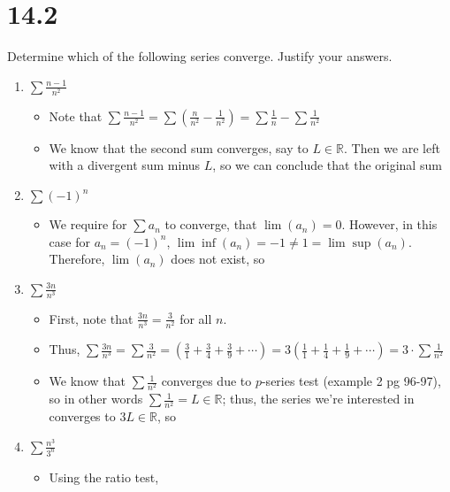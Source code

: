 \documentclass[10pt,a4paper]{article}
\theoremstyle{definition}
\begin{document}
\section*{14.2}
Determine which of the following series converge. Justify your answers.
\begin{enumerate}[label = (\alph*)]
\item $\displaystyle \sum \frac{n - 1}{n^2}$
	\begin{itemize}
	\item Note that $\displaystyle \sum \frac{n - 1}{n^2} = \sum \left(\frac{n}{n^2}- \frac{1}{n^2}\right) = \sum \frac{1}{n} - \sum \frac{1}{n^2}$
	\item We know that the second sum converges, say to $L \in \mathbb{R}$. Then we are left with a divergent sum minus $L$, so we can conclude that the original sum 
	\end{itemize}
\item $\displaystyle \sum (-1)^n$
	\begin{itemize}
	\item We require for $\sum a_n$ to converge, that $\lim (a_n) = 0$. However, in this case for $a_n = (-1)^n$, $\lim \inf (a_n) = -1 \neq 1 = \lim \sup(a_n)$. Therefore, $\lim (a_n)$ does not exist, so 
	\end{itemize}
\item $\displaystyle \sum \frac{3n}{n^3}$
	\begin{itemize}
	\item First, note that $\displaystyle \frac{3n}{n^3} = \frac{3}{n^2}$ for all $n$. 
	\item Thus, $\displaystyle \sum \frac{3n}{n^3} = \sum \frac{3}{n^2} = \left(\frac{3}{1} + \frac{3}{4} + \frac{3}{9} + \cdots\right) = 3\left(\frac{1}{1} + \frac{1}{4} + \frac{1}{9} + \cdots\right) = 3 \cdot \sum \frac{1}{n^2}$
	\item We know that $\displaystyle \sum \frac{1}{n^2}$ converges due to $p$-series test (example 2 pg 96-97), so in other words $\displaystyle \sum \frac{1}{n^2} = L \in \mathbb{R}$; thus, the series we're interested in converges to $3L \in \mathbb{R}$, so 
	\end{itemize}
\item $\displaystyle \sum \frac{n^3}{3^n}$
	\begin{itemize}
	\item Using the ratio test, 

\end{itemize}
\end{enumerate}
\end{document}
